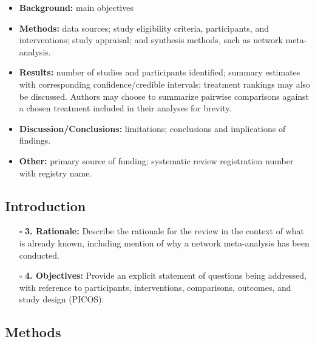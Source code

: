 \documentclass[11pt]{article}
\def\tightlist{}
\begin{document}
\begin{Form}
\begin{itemize}
  \begin{itemize}
  \tightlist
  \item
    \textbf{Background:} main objectives
  \item
    \textbf{Methods:} data sources; study eligibility criteria,
    participants, and interventions; study appraisal; and synthesis
    methods, such as network meta-analysis.
  \item
    \textbf{Results:} number of studies and participants identified;
    summary estimates with corresponding confidence/credible intervals;
    treatment rankings may also be discussed. Authors may choose to
    summarize pairwise comparisons against a chosen treatment included
    in their analyses for brevity.
  \item
    \textbf{Discussion/Conclusions:} limitations; conclusions and
    implications of findings.
  \item
    \textbf{Other:} primary source of funding; systematic review
    registration number with registry name.
  \end{itemize}
\end{itemize}

\subsection{Introduction}\label{introduction}

\begin{itemize}
\tightlist
\item[$\square$]
  \textbf{3. Rationale:} Describe the rationale for the review in the
  context of what is already known, including mention of why a network
  meta-analysis has been conducted.
\item[$\square$]
  \textbf{4. Objectives:} Provide an explicit statement of questions
  being addressed, with reference to participants, interventions,
  comparisons, outcomes, and study design (PICOS).
\end{itemize}

\subsection{Methods}\label{methods}


\end{Form}
\end{document}
